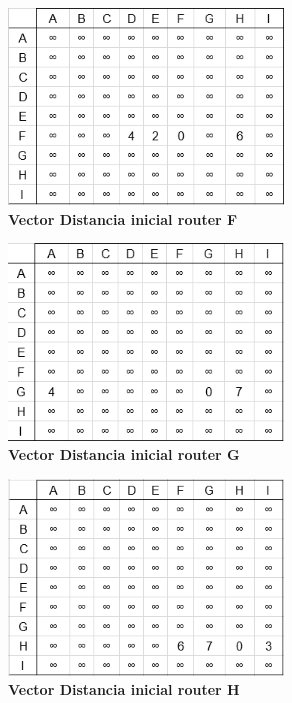 \documentclass[12pt]{article}
\begin{document}
\begin{figure}[H] 
\centering 
\includegraphics[width=0.65\textwidth]{imagenes/2inicialF.png} \caption{\small \textbf{Vector Distancia inicial router F}}
\label{fig:diagrama_13} 
\end{figure}

\begin{figure}[H] 
\centering 
\includegraphics[width=0.65\textwidth]{imagenes/2inicialG.png} \caption{\small \textbf{Vector Distancia inicial router G}}
\label{fig:diagrama_14} 
\end{figure}

\begin{figure}[H] 
\centering 
\includegraphics[width=0.65\textwidth]{imagenes/2inicialH.png} \caption{\small \textbf{Vector Distancia inicial router H}}
\label{fig:diagrama_15} 
\end{figure}
\end{document}
